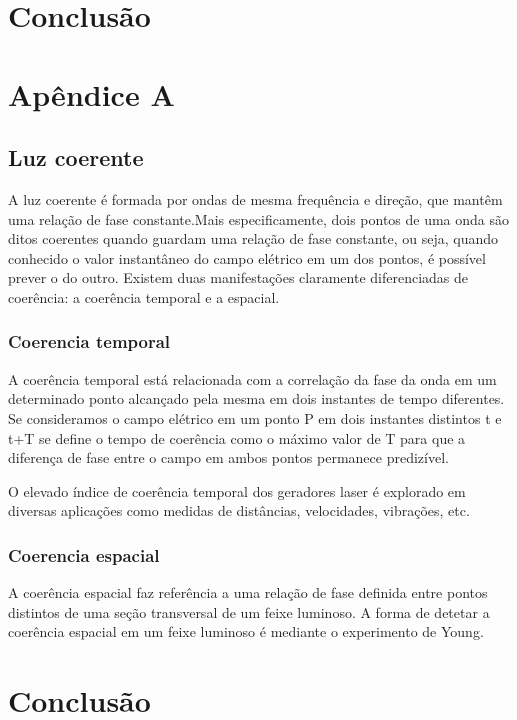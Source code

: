 \documentclass[article]{IEEEtran}
\begin{document}
\section{Conclusão}

\clearpage
\appendix
\section{Apêndice A}
\subsection{Luz coerente}
\label{ap:l-coerente}
A luz coerente é formada por ondas de mesma frequência e direção, que mantêm uma relação de fase constante.Mais especificamente, dois pontos de uma onda são ditos coerentes quando guardam uma relação de fase constante, ou seja, quando conhecido o valor instantâneo do campo elétrico em um dos pontos, é possível prever o do outro. Existem duas manifestações claramente diferenciadas de coerência: a coerência temporal e a espacial.

\subsubsection{Coerencia temporal}
A coerência temporal está relacionada com a correlação da fase da onda em um determinado ponto alcançado pela mesma em dois instantes de tempo diferentes. Se consideramos o campo elétrico em um ponto P em dois instantes distintos t e t+T se define o tempo de coerência como o máximo valor de T para que a diferença de fase entre o campo em ambos pontos permanece predizível.
\par O elevado índice de coerência temporal dos geradores laser é explorado em diversas aplicações como medidas de distâncias, velocidades, vibrações, etc.
\subsubsection{Coerencia espacial}
A coerência espacial faz referência a uma relação de fase definida entre pontos distintos de uma seção transversal de um feixe luminoso.
A forma de detetar a coerência espacial em um feixe luminoso é mediante o experimento de Young. 



\section{Conclusão}
\end{document}
